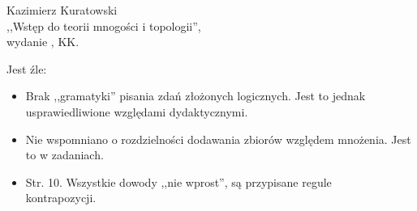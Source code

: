 \documentclass[a4paper,11pt]{article}
\begin{document}
\begin{center}
Kazimierz Kuratowski\\
,,Wstęp do teorii mnogości i topologii'',\\ wydanie , KK.
\end{center}
Jest źle:
\begin{itemize}
\item Brak ,,gramatyki'' pisania zdań złożonych logicznych. Jest to jednak usprawiedliwione względami dydaktycznymi.
\item Nie wspomniano o rozdzielności dodawania zbiorów względem mnożenia. Jest to w zadaniach.
\item Str. 10. Wszystkie dowody ,,nie wprost'', są przypisane regule \\ kontrapozycji.
\end{itemize}
\end{document}
